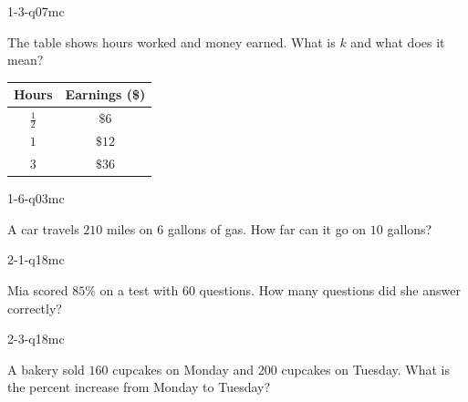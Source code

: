 
\begin{practiceQuestion}{1-3-q07}{mc}
\begin{questionText}
The table shows hours worked and money earned. What is $k$ and what does it mean?

\begin{center}
\begin{tabular}{|c|c|}
\hline \textbf{Hours} & \textbf{Earnings (\$)} \\ \hline $\frac{1}{2}$ & $\$6$ \\ $1$ & $\$12$ \\ $3$ & $\$36$ \\ \hline
\end{tabular}
\end{center}
\end{questionText}
\end{practiceQuestion}

\begin{practiceQuestion}{1-6-q03}{mc}
\begin{questionText}
A car travels $210$ miles on $6$ gallons of gas. How far can it go on $10$ gallons?
\end{questionText}
\end{practiceQuestion}

\begin{practiceQuestion}{2-1-q18}{mc}
\begin{questionText}
Mia scored $85\%$ on a test with $60$ questions. How many questions did she answer correctly?
\end{questionText}
\end{practiceQuestion}

\begin{practiceQuestion}{2-3-q18}{mc}
\begin{questionText}
A bakery sold $160$ cupcakes on Monday and $200$ cupcakes on Tuesday. What is the percent increase from Monday to Tuesday?


\end{questionText}
\end{practiceQuestion}

